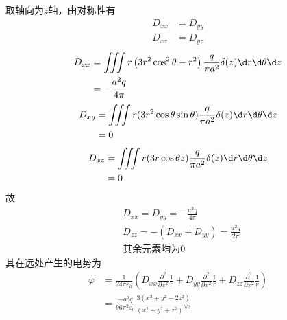 \documentclass{phyasgn}
\begin{document}
\begin{sol}[3]
    取轴向为$z$轴，由对称性有
    \begin{align*}
        D_{xx}&=D_{yy}\\
        D_{xz}&=D_{yz}
    \end{align*}
    \begin{align*}
        D_{xx}&=\iiint r\left(3r^2\cos^2\theta-r^2\right)\frac{q}{\pi a^2}\delta(z)\d r\d \theta\d z\\
        &=-\frac{a^2q}{4\pi}
    \end{align*}
    \begin{align*}
        D_{xy}&=\iiint r(3r^2\cos\theta\sin\theta)\frac{q}{\pi a^2}\delta(z)\d r\d \theta\d z\\
        &=0
    \end{align*}
    \begin{align*}
        D_{xz}&=\iiint r(3r\cos\theta z)\frac{q}{\pi a^2}\delta(z)\d r\d \theta\d z\\
        &=0
    \end{align*}
    故
    \begin{align*}
        &D_{xx}=D_{yy}=-\frac{a^2q}{4\pi}\\
        &D_{zz}=-(D_{xx}+D_{yy})=\frac{a^2q}{2\pi}\\
        &\text{其余元素均为0}
    \end{align*}
    其在远处产生的电势为
    \begin{align*}
        \varphi&=\frac{1}{24\pi\varepsilon_0}\left(D_{xx}\frac{\partial^2}{\partial x^2}\frac{1}{r}+D_{yy}\frac{\partial^2}{\partial x^2}\frac{1}{r}+D_{zz}\frac{\partial^2}{\partial x^2}\frac{1}{r}\right)\\
        &=\frac{-a^2q}{96\pi^2\varepsilon_0}\frac{3 \left(x^2+y^2-2 z^2\right)}{\left(x^2+y^2+z^2\right)^{5/2}}
    \end{align*}
\end{sol}
\end{document}
